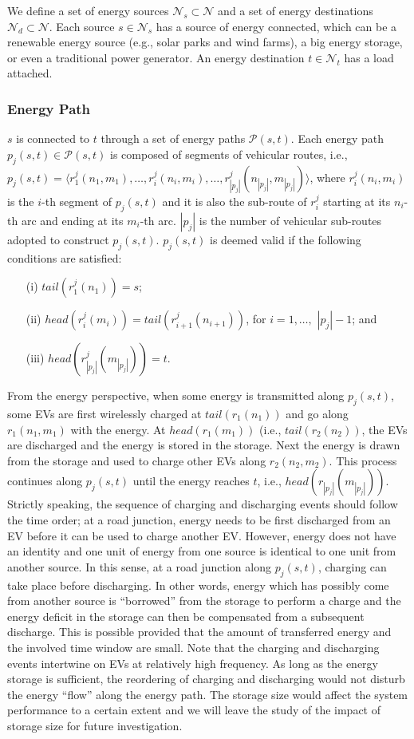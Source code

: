 \documentclass[journal]{IEEEtran}
\begin{document}
We define a set of energy sources $\mathcal{N}_s\subset\mathcal{N}$ and a set of energy destinations $\mathcal{N}_d\subset\mathcal{N}$. Each source $s\in \mathcal{N}_s$ has a source of energy connected, which can be a renewable energy source (e.g., solar parks and wind farms), a big energy storage, or even a traditional power generator. An energy destination $t \in \mathcal{N}_t$ has a load attached. 

\subsubsection{Energy Path}
$s$ is connected to $t$ through a set of energy paths $\mathcal{P}(s,t)$. Each energy path $p_j(s,t)\in \mathcal{P}(s,t)$ is composed of  segments of vehicular routes, i.e., $p_j(s,t) = \langle r_1^j(n_1,m_1),\ldots, r_i^j(n_i,m_i),\ldots,r_{|p_j|}^j(n_{|p_j|},m_{|p_j|}) \rangle$, where $r_i^j(n_i,m_i)$ is the $i$-th segment of $p_j(s,t)$ and it is also the sub-route of $r_i^j$ starting at its $n_i$-th arc and ending at its $m_i$-th arc. $|p_j|$ is  the number of vehicular sub-routes adopted to construct $p_j(s,t)$. $p_j(s,t)$ is deemed valid if the following conditions are satisfied:
\begin{enumerate}
	\item[(i)] $tail(r_1^j(n_1))=s$;
	\item[(ii)] $head(r_i^j(m_i)) = tail(r_{i+1}^j(n_{i+1}))$, for $i=1,\ldots,$ \mbox{$|p_j|-1$}; and
	\item[(iii)] $head(r_{|p_j|}^j(m_{|p_j|}))=t$.
\end{enumerate}
From the energy perspective, when some energy is transmitted along $p_j(s,t)$, some EVs are first wirelessly charged at $tail(r_1(n_1))$ and go along $r_1(n_1,m_1)$ with the energy. At $head(r_1(m_1))$ (i.e., $tail(r_2(n_2))$, the EVs are discharged and the energy is stored in the storage. Next the energy is drawn from the storage and used to charge other EVs along $r_2(n_2,m_2)$. This process continues along $p_j(s,t)$ until the energy reaches $t$, i.e., $head(r_{|p_j|}(m_{|p_j|}))$. Strictly speaking, the sequence of charging and discharging events should follow the time order; at a road junction, energy needs to be first discharged from an EV before it can be used to charge another EV. However, energy does not have an identity and one unit of energy from one source is identical to one unit from another source. In this sense, at a road junction along $p_j(s,t)$, charging can take place before discharging. In other words, energy which has possibly come from another source is ``borrowed'' from the storage to perform a charge and the energy deficit in the storage can then be compensated from a subsequent discharge. This is possible provided that the amount of transferred energy and the involved time window are small. Note that the charging and discharging events intertwine on EVs at relatively high frequency. As long as the energy storage is sufficient, the reordering of charging and discharging would not disturb the energy ``flow'' along the energy path. The storage size would affect the system performance to a certain extent and we will leave the study of the impact of storage size for future investigation.
\end{document}
